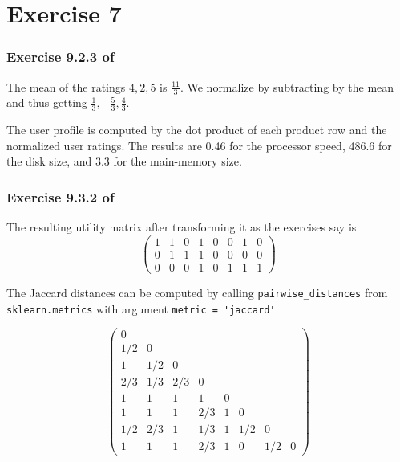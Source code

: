 \documentclass{article}
\begin{document}
\section*{Exercise 7}

\subsubsection*{Exercise 9.2.3 of \cite{mmds}}

The mean of the ratings \(4, 2, 5\) is \(\frac{11}{3}\).
We normalize by subtracting by the mean and thus getting
\(\frac{1}{3}, -\frac{5}{3}, \frac{4}{3}\).

The user profile is computed by the dot product of each product row
and the normalized user ratings.
The results are 0.46 for the processor speed,
486.6 for the disk size,
and 3.3 for the main-memory size.

\subsubsection*{Exercise 9.3.2 of \cite{mmds}}

The resulting utility matrix after transforming it as the exercises say is
\begin{equation*}
    \begin{pmatrix}
        1 & 1 & 0 & 1 & 0 & 0 & 1 & 0\\
        0 & 1 & 1 & 1 & 0 & 0 & 0 & 0\\
        0 & 0 & 0 & 1 & 0 & 1 & 1 & 1
    \end{pmatrix}
\end{equation*}

The Jaccard distances can be computed by calling
\verb|pairwise_distances| from 
\verb|sklearn.metrics|
with argument \verb|metric = 'jaccard'|

\begin{equation*}
    \begin{pmatrix}
        0\\
        1/2 & 0\\
        1 & 1/2 & 0\\
        2/3 & 1/3 & 2/3 & 0\\
        1 & 1 & 1 & 1 & 0\\
        1 & 1 & 1 & 2/3 & 1 & 0\\
        1/2 & 2/3 & 1 & 1/3 & 1 & 1/2 & 0\\
        1 & 1 & 1 & 2/3 & 1 & 0 & 1/2 & 0
    \end{pmatrix}
\end{equation*}
\end{document}

